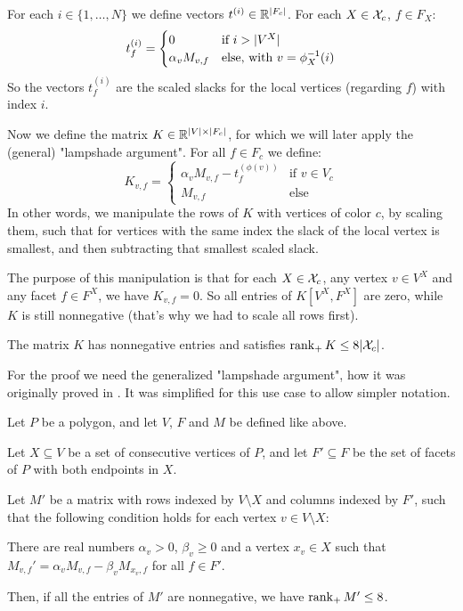 For each $i \in \{1,\dots,N\}$ we define vectors $t^{(i)} \in \mathbb{R}^{\lvert F_c\rvert}$. For each $X \in \mathcal{X}_c$, $f \in F_X$:
\begin{equation*}
  t_f^{(i)} = 
  \begin{cases}
    0 &\text{if } i > \lvert V^X\rvert\\
    \alpha_v M_{v,f} &\text{else, with } v = \phi_X^{-1}(i)
  \end{cases}
\end{equation*}
So the vectors $t_f^{(i)}$ are the scaled slacks for the local vertices (regarding $f$) with index $i$.

Now we define the matrix $K \in \mathbb{R}^{\lvert V\rvert \times \lvert F_c\rvert}$, for which we will later apply the (general) "lampshade argument". For all $f \in F_c$ we define:
\begin{equation*}
  K_{v,f} = 
  \begin{cases}
    \alpha_v M_{v,f} - t_f^{(\phi(v))} & \text{if } v \in V_c\\
    M_{v,f} & \text{else}
  \end{cases}
\end{equation*}
In other words, we manipulate the rows of $K$ with vertices of color $c$, by scaling them, such that for vertices with the same index the slack of the local vertex is smallest, and then subtracting that smallest scaled slack.

The purpose of this manipulation is that for each $X \in \mathcal{X}_c$, any vertex $v \in V^X$ and any facet $f \in F^X$, we have $K_{v,f} = 0$. So all entries of $K[V^X, F^X]$ are zero, while $K$ is still nonnegative (that's why we had to scale all rows first).

\begin{lemma}\label{lemma:rank-of-K}
  The matrix $K$ has nonnegative entries and satisfies $\operatorname{rank}_+ K \leq 8\lvert\mathcal{X}_c\rvert$.
\end{lemma}

For the proof we need the generalized "lampshade argument", how it was originally proved in \cite[Lemma 3.1]{shitov2014sublinear}. It was simplified for this use case to allow simpler notation.

\begin{lemma}\label{lemma:shitov-lampshade}
  Let $P$ be a polygon, and let $V$, $F$ and $M$ be defined like above. 
  
  Let $X \subseteq V$ be a set of consecutive vertices of $P$, and let $F' \subseteq F$ be the set of facets of $P$ with both endpoints in $X$.

  Let $M'$ be a matrix with rows indexed by $V\setminus X$ and columns indexed by $F'$, such that the following condition holds for each vertex $v\in V\setminus X$:
  
  There are real numbers $\alpha_v>0$, $\beta_v\geq 0$ and a vertex $x_v\in X$ such that\\
  $M_{v,f}'=\alpha_v M_{v,f}-\beta_v M_{x_v,f}$ for all $f\in F'$.

  Then, if all the entries of $M'$ are nonnegative, we have $\operatorname{rank}_+ M'\le 8$.
\end{lemma}

